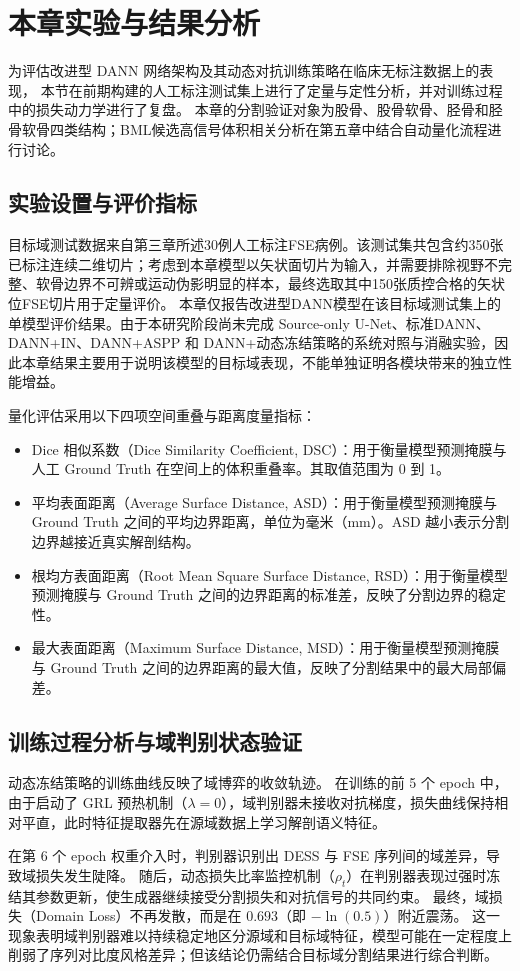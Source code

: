 \section{本章实验与结果分析}
  为评估改进型 DANN 网络架构及其动态对抗训练策略在临床无标注数据上的表现，
  本节在前期构建的人工标注测试集上进行了定量与定性分析，并对训练过程中的损失动力学进行了复盘。
  本章的分割验证对象为股骨、股骨软骨、胫骨和胫骨软骨四类结构；BML候选高信号体积相关分析在第五章中结合自动量化流程进行讨论。
  \subsection{实验设置与评价指标}
    目标域测试数据来自第三章所述30例人工标注FSE病例。该测试集共包含约350张已标注连续二维切片；考虑到本章模型以矢状面切片为输入，并需要排除视野不完整、软骨边界不可辨或运动伪影明显的样本，最终选取其中150张质控合格的矢状位FSE切片用于定量评价。
    本章仅报告改进型DANN模型在该目标域测试集上的单模型评价结果。由于本研究阶段尚未完成 Source-only U-Net、标准DANN、DANN+IN、DANN+ASPP 和 DANN+动态冻结策略的系统对照与消融实验，因此本章结果主要用于说明该模型的目标域表现，不能单独证明各模块带来的独立性能增益。
    \par 量化评估采用以下四项空间重叠与距离度量指标：
    \begin{itemize}
      \item Dice 相似系数（Dice Similarity Coefficient, DSC）：用于衡量模型预测掩膜与人工 Ground Truth 在空间上的体积重叠率。其取值范围为 0 到 1。
      \item 平均表面距离（Average Surface Distance, ASD）：用于衡量模型预测掩膜与 Ground Truth 之间的平均边界距离，单位为毫米（mm）。ASD 越小表示分割边界越接近真实解剖结构。
      \item 根均方表面距离（Root Mean Square Surface Distance, RSD）：用于衡量模型预测掩膜与 Ground Truth 之间的边界距离的标准差，反映了分割边界的稳定性。
      \item 最大表面距离（Maximum Surface Distance, MSD）：用于衡量模型预测掩膜与 Ground Truth 之间的边界距离的最大值，反映了分割结果中的最大局部偏差。
    \end{itemize}
  \subsection{训练过程分析与域判别状态验证}
    动态冻结策略的训练曲线反映了域博弈的收敛轨迹。
    在训练的前 5 个 epoch 中，由于启动了 GRL 预热机制（$\lambda=0$），域判别器未接收对抗梯度，损失曲线保持相对平直，此时特征提取器先在源域数据上学习解剖语义特征。
    \par 在第 6 个 epoch 权重介入时，判别器识别出 DESS 与 FSE 序列间的域差异，导致域损失发生陡降。
    随后，动态损失比率监控机制（$\rho_t$）在判别器表现过强时冻结其参数更新，使生成器继续接受分割损失和对抗信号的共同约束。
    最终，域损失（Domain Loss）不再发散，而是在 $0.693$（即 $-\ln(0.5)$）附近震荡。
    这一现象表明域判别器难以持续稳定地区分源域和目标域特征，模型可能在一定程度上削弱了序列对比度风格差异；但该结论仍需结合目标域分割结果进行综合判断。
